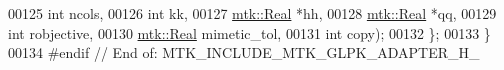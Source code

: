 \begin{DoxyCode}
00125                                           \textcolor{keywordtype}{int} ncols,
00126                                           \textcolor{keywordtype}{int} kk,
00127                                           \hyperlink{group__c01-roots_gac080bbbf5cbb5502c9f00405f894857d}{mtk::Real} *hh,
00128                                           \hyperlink{group__c01-roots_gac080bbbf5cbb5502c9f00405f894857d}{mtk::Real} *qq,
00129                                           \textcolor{keywordtype}{int} robjective,
00130                                           \hyperlink{group__c01-roots_gac080bbbf5cbb5502c9f00405f894857d}{mtk::Real} mimetic\_tol,
00131                                           \textcolor{keywordtype}{int} copy);
00132 \};
00133 \}
00134 \textcolor{preprocessor}{#endif  // End of: MTK\_INCLUDE\_MTK\_GLPK\_ADAPTER\_H\_}
\end{DoxyCode}
